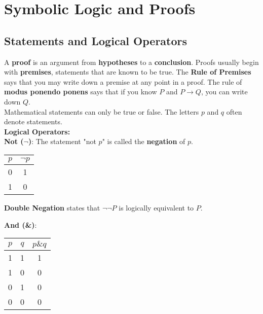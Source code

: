\section{Symbolic Logic and Proofs}

    \subsection{Statements and Logical Operators}
        A \textbf{proof} is an argument from \textbf{hypotheses} to a \textbf{conclusion}.
        Proofs usually begin with \textbf{premises}, statements that are known to be true.
        The \textbf{Rule of Premises} says that you may write down a premise at any point in a
        proof. The rule of \textbf{modus ponendo ponens} says that if you know $P$ and
        $P\rightarrow Q$, you can write down $Q$. \\

        \noindent Mathematical statements can only be true or false. The letters $p$ and $q$
        often denote statements. \\

        \noindent \color{purple} \textbf{Logical Operators:} \color{black} \\
        \textbf{Not ($\neg$)}: The statement "not $p$" is called the \textbf{negation} of $p$. \\

        \begin{center}
            \begin{tabular} {|c|c|}
                \hline
                $p$ & $\neg p$ \\
                \hline
                0   & 1        \\
                \hline
                1   & 0        \\
                \hline
            \end{tabular}
        \end{center}

        \noindent \textbf{Double Negation} states that $\neg\neg P$ is logically equivalent to $P$.

        \noindent \textbf{And (\&)}: \\

        \begin{center}
            \begin{tabular} {|c|c|c|}
                \hline
                $p$ & $q$ & $p\& q$ \\
                \hline
                1 & 1 & 1 \\
                \hline
                1 & 0 & 0 \\
                \hline
                0 & 1 & 0 \\
                \hline
                0 & 0 & 0 \\
                \hline
            \end{tabular}
        \end{center}

